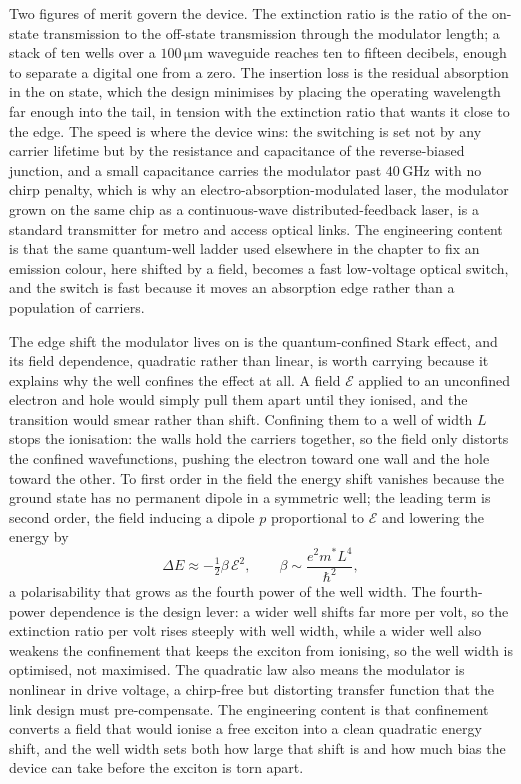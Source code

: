 Two figures of merit govern the device. The extinction ratio is the ratio of
the on-state transmission to the off-state transmission through the modulator
length; a stack of ten wells over a $100\,\si{\micro\meter}$ waveguide reaches
ten to fifteen decibels, enough to separate a digital one from a zero. The
insertion loss is the residual absorption in the on state, which the design
minimises by placing the operating wavelength far enough into the tail, in
tension with the extinction ratio that wants it close to the edge. The speed is
where the device wins: the switching is set not by any carrier lifetime but by
the resistance and capacitance of the reverse-biased junction, and a small
capacitance carries the modulator past $40\,\si{\giga\hertz}$ with no chirp
penalty, which is why an electro-absorption-modulated laser, the modulator grown
on the same chip as a continuous-wave distributed-feedback laser, is a standard
transmitter for metro and access optical links. The engineering content is that
the same quantum-well ladder used elsewhere in the chapter to fix an emission
colour, here shifted by a field, becomes a fast low-voltage optical switch, and
the switch is fast because it moves an absorption edge rather than a population
of carriers.



\begin{mastery}
The edge shift the modulator lives on is the quantum-confined Stark effect, and
its field dependence, quadratic rather than linear, is worth carrying because it
explains why the well confines the effect at all. A field $\mathcal{E}$ applied
to an unconfined electron and hole would simply pull them apart until they
ionised, and the transition would smear rather than shift. Confining them to a
well of width $L$ stops the ionisation: the walls hold the carriers together, so
the field only distorts the confined wavefunctions, pushing the electron toward
one wall and the hole toward the other. To first order in the field the energy
shift vanishes because the ground state has no permanent dipole in a symmetric
well; the leading term is second order, the field inducing a dipole $p$
proportional to $\mathcal{E}$ and lowering the energy by
\[
\Delta E \approx -\tfrac{1}{2}\beta\,\mathcal{E}^{2},
\qquad
\beta \sim \frac{e^{2}m^{*}L^{4}}{\hbar^{2}},
\]
a polarisability that grows as the fourth power of the well width. The
fourth-power dependence is the design lever: a wider well shifts far more per
volt, so the extinction ratio per volt rises steeply with well width, while a
wider well also weakens the confinement that keeps the exciton from ionising, so
the well width is optimised, not maximised. The quadratic law also means the
modulator is nonlinear in drive voltage, a chirp-free but distorting transfer
function that the link design must pre-compensate. The engineering content is
that confinement converts a field that would ionise a free exciton into a
clean quadratic energy shift, and the well width sets both how large that shift
is and how much bias the device can take before the exciton is torn apart.
\end{mastery}

